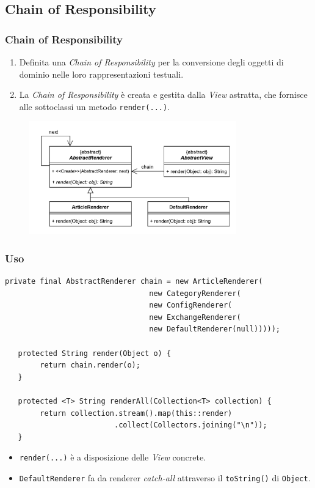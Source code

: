 \subsection{Chain of Responsibility}
\beamertitle

\begin{frame}
    \frametitle{Chain of Responsibility}
    \begin{enumerate}
        \item Definita una \emph{Chain of Responsibility} per la conversione degli oggetti
        di dominio nelle loro rappresentazioni testuali.
        \item La \emph{Chain of Responsibility} è creata e gestita dalla \emph{View} astratta,
        che fornisce alle sottoclassi un metodo \texttt{render(...)}.
    \end{enumerate}

    \begin{figure}
        \includegraphics[width=0.8\textwidth]{img/chain.png}
    \end{figure}
\end{frame}

\begin{frame}[fragile]
  \frametitle{Uso}
  \begin{lstlisting}[autogobble, title={\texttt{AbstractView.java}}]
   private final AbstractRenderer chain = new ArticleRenderer(
                                 new CategoryRenderer(
                                 new ConfigRenderer(
                                 new ExchangeRenderer(
                                 new DefaultRenderer(null)))));

   protected String render(Object o) {
        return chain.render(o);
   }

   protected <T> String renderAll(Collection<T> collection) {
        return collection.stream().map(this::render)
                         .collect(Collectors.joining("\n"));
   }
  \end{lstlisting}
    \begin{itemize}
        \item \texttt{render(...)} è a disposizione delle \emph{View} concrete.
        \item \texttt{DefaultRenderer} fa da renderer \emph{catch-all}
        attraverso il \texttt{toString()} di \texttt{Object}.
    \end{itemize}
\end{frame}

